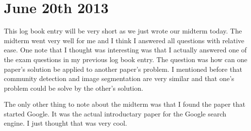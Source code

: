 \documentclass[conference]{IEEEtran}
\begin{document}
\section{June 20th 2013}
This log book entry will be very short as we just wrote our midterm today. The midterm went very well
for me and I think I answered all questions with relative ease. One note that I thought was interesting
was that I actually answered one of the exam questions in my previous log book entry. The question was
how can one paper's solution be applied to another paper's problem. I mentioned before that community
detection and image segmentation are very similar and that one's problem could be solve by the other's
solution.

The only other thing to note about the midterm was that I found the paper that started Google. It was
the actual introductary paper for the Google search engine. I just thought that was very cool.



\balance



\end{document}
